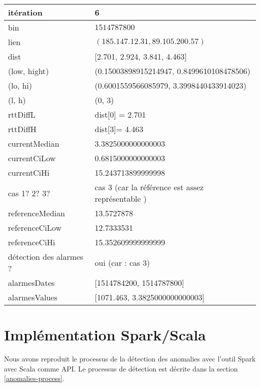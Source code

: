 	\begin{table}[H]
	\centering
	
	\begin{tabularx}{\linewidth}{|l|X| }
		\hline
		itération & 6	\\ \hline
		bin & $1514787800$ \\ \hline
		lien & $(185.147.12.31, 89.105.200.57)$  \\ \hline
		dist& [2.701, 2.924, 3.841, 4.463]	\\ \hline
		(low, hight)& (0.15003898915214947, 0.8499610108478506) 	\\ \hline
		(lo, hi)&(0.6001559566085979, 3.3998440433914023)  \\ \hline
		(l, h) & (0, 3) 	\\ \hline
		rttDiffL& dist[0] = 2.701	\\ \hline
		rttDiffH& dist[3]= 4.463	\\ \hline
		currentMedian&  3.3825000000000003	\\ \hline
		currentCiLow& 0.6815000000000003 	\\ \hline
		currentCiHi& 15.243713899999998	\\ \hline
		cas 1? 2? 3?& cas 3 (car la référence est assez représentable )  \\ \hline
		referenceMedian& 13.5727878 	\\ \hline
		referenceCiLow&  12.7333531	\\ \hline
		referenceCiHi& 15.352609999999999 	\\ \hline
		détection des alarmes ?& oui (car : cas 3)	\\ \hline
		alarmesDates& [1514784200, 1514787800]	\\ \hline
		alarmesValues& [1071.463, 3.3825000000000003]	\\ \hline
		
	\end{tabularx}
\end{table}



\section{Implémentation Spark/Scala} \label{implementation-scala}


Nous avons reproduit le processus de la détection des anomalies avec l'outil Spark avec Scala comme API. Le processus de détection est décrite dans la section \ref{anomalies-process}.

